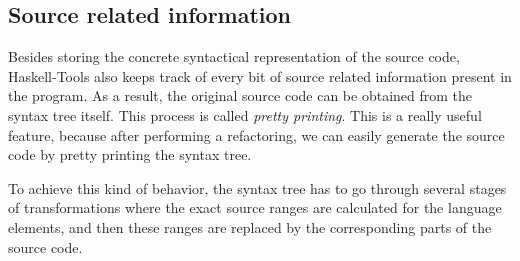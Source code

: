 \documentclass[main.tex]{subfiles}
\begin{document}
	
	\subsection{Source related information}
	
	Besides storing the concrete syntactical representation of the source code, Haskell-Tools also keeps track of every bit of source related information present in the program. As a result, the original source code can be obtained from the syntax tree itself. This process is called \emph{pretty printing}. This is a really useful feature, because after performing a refactoring, we can easily generate the source code by pretty printing the syntax tree.
	
	To achieve this kind of behavior, the syntax tree has to go through several stages of transformations where the exact source ranges are calculated for the language elements, and then these ranges are replaced by the corresponding parts of the source code.
	
	
	
\end{document}

